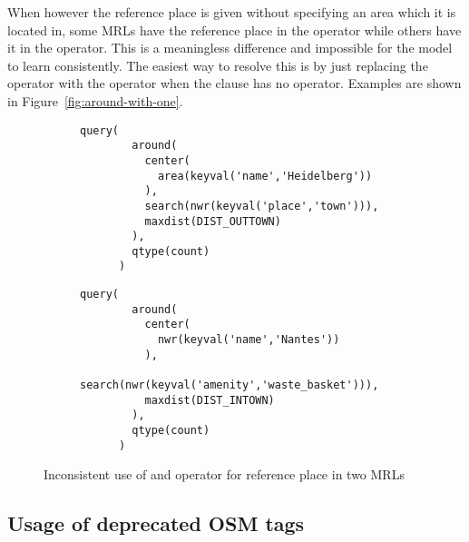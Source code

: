 When however the reference place is given without specifying an area which it is
located in, some MRLs have the reference place in the  operator while
others have it in the  operator. This is a meaningless difference and
impossible for the model to learn consistently. The easiest way to resolve this
is by just replacing the  operator with the  operator when
the  clause has no  operator. Examples are shown in
Figure~\ref{fig:around-with-one}.

\begin{figure}[ht!]
  \centering
  \begin{subfigure}{\textwidth}
    \begin{lstlisting}[style=MyMRL]
      query(
        around(
          center(
            area(keyval('name','Heidelberg'))
          ),
          search(nwr(keyval('place','town'))),
          maxdist(DIST_OUTTOWN)
        ),
        qtype(count)
      )
    \end{lstlisting}
    \caption{}
  \end{subfigure}
  \begin{subfigure}{\textwidth}
    \begin{lstlisting}[style=MyMRL]
      query(
        around(
          center(
            nwr(keyval('name','Nantes'))
          ),
          search(nwr(keyval('amenity','waste_basket'))),
          maxdist(DIST_INTOWN)
        ),
        qtype(count)
      )
    \end{lstlisting}
    \caption{}
  \end{subfigure}
  \caption{Inconsistent use of  and  operator for reference
    place in two MRLs}
  \label{fig:around-with-both}
\end{figure}


\subsection{Usage of deprecated OSM tags}

